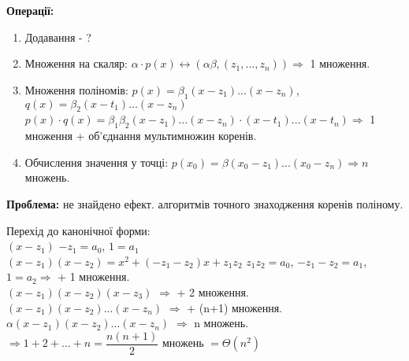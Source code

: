 \documentclass[a4paper,12pt]{article}
\newcommand\tab[1][1cm]{\hspace*{#1}}
\begin{document}
\begin{enumerate}
        \textbf{Операції:} 
        \begin{enumerate}
            \item Додавання - ? 
            \item Множення на скаляр: $\alpha\cdot p(x)\leftrightarrow (\alpha\beta,(z_1,...,z_n))\Rightarrow$ 1 множення.
            \item Множення поліномів: $p(x)=\beta_1(x-z_1)...(x-z_n)$, $q(x)=\beta_2(x-t_1)...(x-z_n)$ \\
            $p(x)\cdot q(x)=\beta_1\beta_2(x-z_1)...(x-z_n)\cdot(x-t_1)...(x-t_n)\Rightarrow$ 1 множення + об'єднання мультимножин коренів.
            \item Обчислення значення у точці: $p(x_0)=\beta(x_0-z_1)...(x_0-z_n)\Rightarrow n$ множень. \\
        \end{enumerate}
        \textbf{Проблема:} не знайдено ефект. алгоритмів точного знаходження коренів поліному.
    \end{enumerate}

\newpage
    Перехід до канонічної форми: \\
    $(x-z_1)$ \tab \tab \tab \tab \tab \tab \tab $-z_1=a_0$, $1=a_1$ \\
    $(x-z_1)(x-z_2)=x^2+(-z_1-z_2)x+z_1z_2$ \tab $z_1z_2=a_0$, $-z_1-z_2=a_1$, $1=a_2\Rightarrow$ + 1 множення. \\
    $(x-z_1)(x-z_2)(x-z_3)$ \tab \tab \tab \tab $\Rightarrow$ + 2 множення. \\
    $(x-z_1)(x-z_2)...(x-z_n)$ \tab \tab \tab $\Rightarrow$ + (n+1) множення. \\
    $\alpha(x-z_1)(x-z_2)...(x-z_n)$ \tab \tab \tab $\Rightarrow$ n множень. \\
    $\Rightarrow 1+2+...+n=\dfrac{n(n+1)}{2}$ множень $=\Theta(n^2)$
\end{document}
